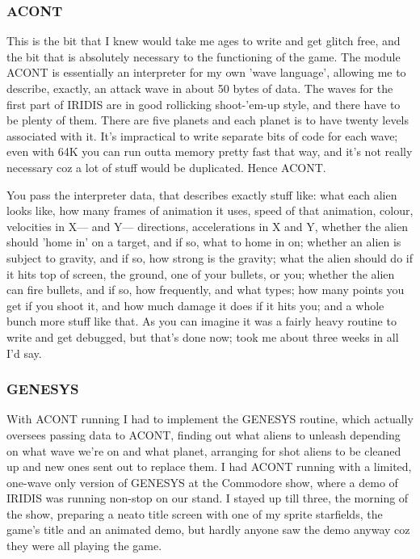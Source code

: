 \subsubsection{ACONT}
This is the bit that I knew would take me ages to write and get glitch free, and the bit that is absolutely necessary to the functioning of the game. The module ACONT is essentially an interpreter for my own 'wave language', allowing me to describe, exactly, an attack wave in about 50 bytes of data. The waves for the first part of IRIDIS are in good rollicking shoot-'em-up style, and there have to be plenty of them. There are five planets and each planet is to have twenty levels associated with it. It's impractical to write separate bits of code for each wave; even with 64K you can run outta memory pretty fast that way, and it's not really necessary coz a lot of stuff would be duplicated. Hence ACONT.

You pass the interpreter data, that describes exactly stuff like: what each alien looks like, how many frames of animation it uses, speed of that animation, colour, velocities in X— and Y— directions, accelerations in X and Y, whether the alien should 'home in' on a target, and if so, what to home in on; whether an alien is subject to gravity, and if so, how strong is the gravity; what the alien should do if it hits top of screen, the ground, one of your bullets, or you; whether the alien can fire bullets, and if so, how frequently, and what types; how many points you get if you shoot it, and how much damage it does if it hits you; and a whole bunch more stuff like that. As you can imagine it was a fairly heavy routine to write and get debugged, but that's done now; took me about three weeks in all I'd say.

\subsubsection{GENESYS}
With ACONT running I had to implement the GENESYS routine, which actually oversees passing data to ACONT, finding out what aliens to unleash depending on what wave we're on and what planet, arranging for shot aliens to be cleaned up and new ones sent out to replace them. I had ACONT running with a limited, one-wave only version of GENESYS at the Commodore show, where a demo of IRIDIS was running non-stop on our stand. I stayed up till three, the morning of the show, preparing a neato title screen with one of my sprite starfields, the game's title and an animated demo, but hardly anyone saw the demo anyway coz they were all playing the game.

